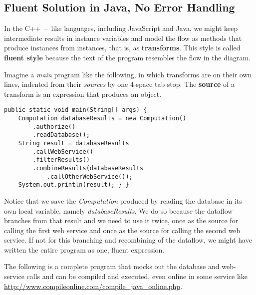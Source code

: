 \documentclass[11pt]{article}
\begin{document}
\subsection{Fluent Solution in Java, No Error Handling}
\label{sec-2-1}

In the \mbox{C++ -- like} languages, including JavaScript and Java,
we might keep intermediate results in instance variables and model
the flow as methods that produce instances from instances, that is,
as \textbf{transforms}. This style is called \textbf{fluent style}
because the text of the program resembles the flow in the diagram.

Imagine a \emph{main} program like the following, in which transforms are
on their own lines, indented from their \emph{sources} by one
\mbox{4-space} tab stop. The \textbf{source} of a transform is an
expression that produces an object.

\begin{verbatim}
public static void main(String[] args) {
    Computation databaseResults = new Computation()
        .authorize()
        .readDatabase();
    String result = databaseResults
        .callWebService()
        .filterResults()
        .combineResults(databaseResults
            .callOtherWebService());
    System.out.println(result); } }
\end{verbatim}

Notice that we save the \emph{Computation} produced by reading the
database in its own local variable, namely \emph{databaseResults}. We do
so because the dataflow branches from that result and we need to
use it twice, once as the source for calling the first web service
and once as the source for calling the second web service. If not
for this branching and recombining of the dataflow, we might have
written the entire program as one, fluent expression. 

The following is a complete program that mocks out the database and
web-service calls and can be compiled and executed, even online in
some service like \url{http://www.compileonline.com/compile_java_online.php}.
\end{document}
